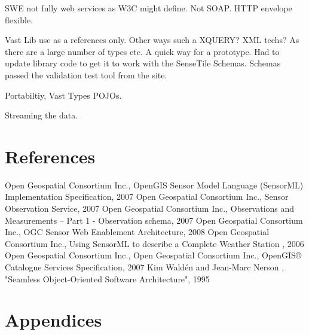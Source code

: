 \documentclass[]{final_report}
\begin{document}
SWE not fully web services as W3C might define. Not SOAP. HTTP envelope
flexible.

Vast Lib use as a references only. Other ways such a XQUERY? XML techs?
As there are a large number of types etc. A quick way for a prototype.
Had to update library code to get it to work with the SenseTile Schemas. Schemas
passed the validation test tool from the site.

Portabiltiy, Vast Types POJOs.

Streaming the data.

\chapter{References}
\newpage
\begin{thebibliography}{99}
Open Geospatial Consortium Inc., OpenGIS Sensor Model Language (SensorML) Implementation Specification, 2007
Open Geospatial Consortium Inc.,  Sensor Observation Service, 2007
Open Geospatial Consortium Inc., Observations and Measurements – Part 1 - Observation schema, 2007
Open Geospatial Consortium Inc., OGC Sensor Web Enablement Architecture, 2008
Open Geospatial Consortium Inc., Using SensorML to describe a
Complete Weather Station , 2006
Open Geospatial Consortium Inc.,
Open Geospatial Consortium Inc., OpenGIS® Catalogue Services Specification, 2007
Kim Waldén and Jean-Marc Nerson , "Seamless Object-Oriented Software Architecture", 1995
\end{thebibliography}
\label{endpage}


\chapter{Appendices}


\end{document}
